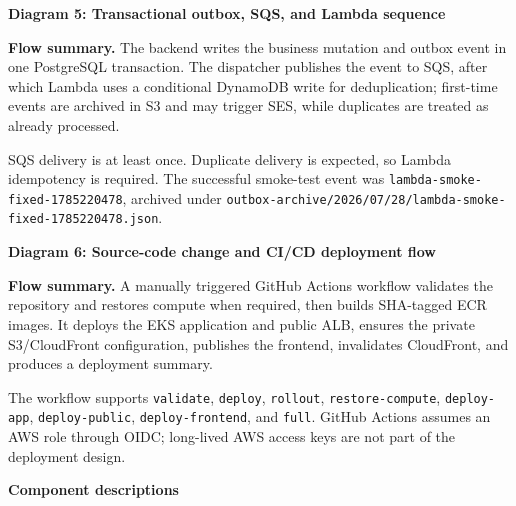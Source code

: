 \vspace{0.5em}\noindent\textbf{Diagram 5: Transactional outbox, SQS, and Lambda
sequence}\par

\textbf{Flow summary.} The backend writes the business mutation and
outbox event in one PostgreSQL transaction. The dispatcher publishes the
event to SQS, after which Lambda uses a conditional DynamoDB write for
deduplication; first-time events are archived in S3 and may trigger SES,
while duplicates are treated as already processed.

SQS delivery is at least once. Duplicate delivery is expected, so Lambda
idempotency is required. The successful smoke-test event was
\texttt{lambda-\allowbreak{}smoke-\allowbreak{}fixed-\allowbreak{}1785220478}, archived under
\texttt{outbox-\allowbreak{}archive/\allowbreak{}2026/\allowbreak{}07/\allowbreak{}28/\allowbreak{}lambda-\allowbreak{}smoke-\allowbreak{}fixed-\allowbreak{}1785220478.\allowbreak{}json}.

\vspace{0.5em}\noindent\textbf{Diagram 6: Source-code change and CI/CD deployment
flow}\par

\textbf{Flow summary.} A manually triggered GitHub Actions workflow
validates the repository and restores compute when required, then builds
SHA-tagged ECR images. It deploys the EKS application and public ALB,
ensures the private S3/CloudFront configuration, publishes the frontend,
invalidates CloudFront, and produces a deployment summary.

The workflow supports \texttt{validate}, \texttt{deploy},
\texttt{rollout}, \texttt{restore-\allowbreak{}compute}, \texttt{deploy-\allowbreak{}app},
\texttt{deploy-\allowbreak{}public}, \texttt{deploy-\allowbreak{}frontend}, and \texttt{full}.
GitHub Actions assumes an AWS role through OIDC; long-lived AWS access
keys are not part of the deployment design.

\vspace{0.5em}\noindent\textbf{Component descriptions}\par

